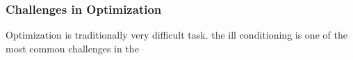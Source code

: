 \subsubsection{Challenges in Optimization}

Optimization is traditionally very difficult task. 
the ill conditioning is one of the most common challenges in the 